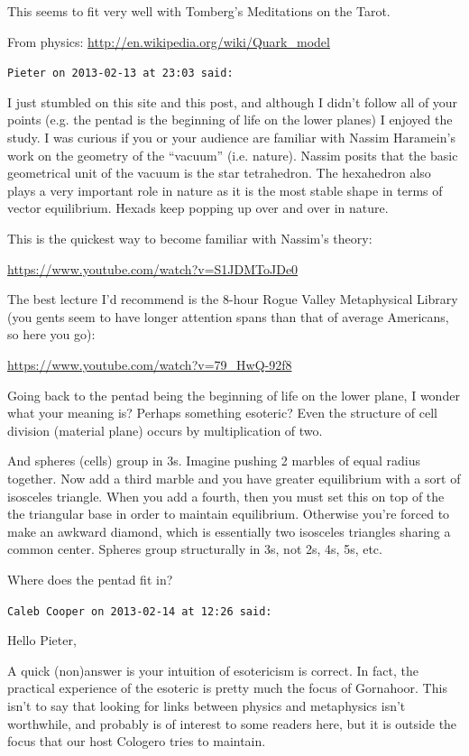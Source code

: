 \begin{footnotesize}
\begin{sffamily}
This seems to fit very well with Tomberg's Meditations on the Tarot.

From physics:
\url{http://en.wikipedia.org/wiki/Quark\_model}


\hfill

\texttt{Pieter on 2013-02-13 at 23:03 said:}

I just stumbled on this site and this post, and although I didn't follow all of your points (e.g. the pentad is the beginning of life on the lower planes) I enjoyed the study. I was curious if you or your audience are familiar with Nassim Haramein's work on the geometry of the ``vacuum'' (i.e. nature). Nassim posits that the basic geometrical unit of the vacuum is the star tetrahedron. The hexahedron also plays a very important role in nature as it is the most stable shape in terms of vector equilibrium. Hexads keep popping up over and over in nature.

This is the quickest way to become familiar with Nassim's theory:

\url{https://www.youtube.com/watch?v=S1JDMToJDe0}


The best lecture I'd recommend is the 8-hour Rogue Valley Metaphysical Library (you gents seem to have longer attention spans than that of average Americans, so here you go):

\url{https://www.youtube.com/watch?v=79\_HwQ-92f8}


Going back to the pentad being the beginning of life on the lower plane, I wonder what your meaning is? Perhaps something esoteric? Even the structure of cell division (material plane) occurs by multiplication of two.

And spheres (cells) group in 3s. Imagine pushing 2 marbles of equal radius together. Now add a third marble and you have greater equilibrium with a sort of isosceles triangle. When you add a fourth, then you must set this on top of the the triangular base in order to maintain equilibrium. Otherwise you're forced to make an awkward diamond, which is essentially two isosceles triangles sharing a common center. Spheres group structurally in 3s, not 2s, 4s, 5s, etc.

Where does the pentad fit in?

\hfill

\texttt{Caleb Cooper on 2013-02-14 at 12:26 said:}

Hello Pieter,

A quick (non)answer is your intuition of esotericism is correct. In fact, the practical experience of the esoteric is pretty much the focus of Gornahoor. This isn't to say that looking for links between physics and metaphysics isn't worthwhile, and probably is of interest to some readers here, but it is outside the focus that our host Cologero tries to maintain.


\end{sffamily}
\end{footnotesize}
